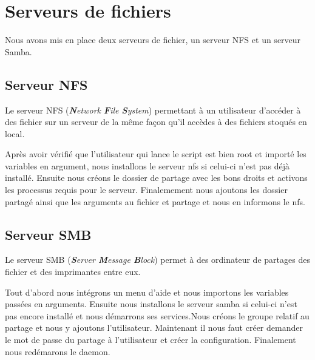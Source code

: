 \section{Serveurs de fichiers}
Nous avons mis en place deux serveurs de fichier, un serveur NFS et un serveur Samba. 
\subsection{Serveur NFS}
Le serveur NFS (\textit{\textbf{N}etwork \textbf{F}ile \textbf{S}ystem}) permettant à un utilisateur d'accéder à des fichier sur un serveur de la même façon qu'il accèdes à des fichiers stoqués en local.



Après avoir vérifié que l'utilisateur qui lance le script est bien root et importé les variables en argument, nous installons le serveur nfs si celui-ci n'est pas déjà installé. Ensuite nous créons le dossier de partage avec les bons droits et activons les processus requis pour le serveur. Finalemement nous ajoutons les dossier partagé ainsi que les arguments au fichier et partage et nous en informons le nfs.

\subsection{Serveur SMB}
Le serveur SMB (\textit{\textbf{S}erver \textbf{M}essage \textbf{B}lock}) permet à des ordinateur de partages des fichier et des imprimantes entre eux.



Tout d'abord nous intégrons un menu d'aide et nous importons les variables passées en arguments. Ensuite nous installons le serveur samba si celui-ci n'est pas encore installé et nous démarrons ses services.Nous créons le groupe relatif au partage et nous y ajoutons l'utilisateur. Maintenant il nous faut créer demander le mot de passe du partage à l'utilisateur et créer la configuration. Finalement nous redémarons le daemon.

